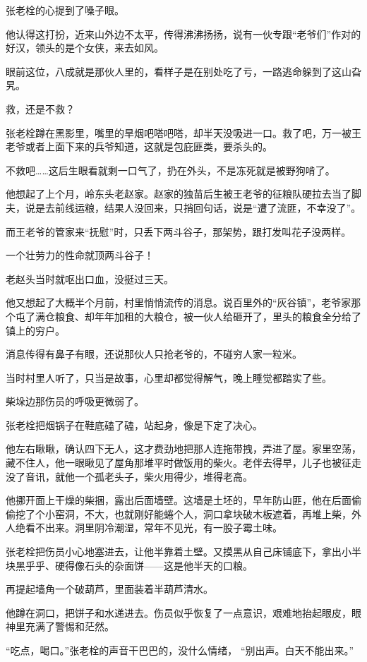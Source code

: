 张老栓的心提到了嗓子眼。

他认得这打扮，近来山外边不太平，传得沸沸扬扬，说有一伙专跟“老爷们”作对的好汉，领头的是个女侠，来去如风。

眼前这位，八成就是那伙人里的，看样子是在别处吃了亏，一路逃命躲到了这山旮旯。

救，还是不救？

张老栓蹲在黑影里，嘴里的旱烟吧嗒吧嗒，却半天没吸进一口。救了吧，万一被王老爷或者上面下来的兵爷知道，这就是包庇匪类，要杀头的。

不救吧……这后生眼看就剩一口气了，扔在外头，不是冻死就是被野狗啃了。

他想起了上个月，岭东头老赵家。赵家的独苗后生被王老爷的征粮队硬拉去当了脚夫，说是去前线运粮，结果人没回来，只捎回句话，说是“遭了流匪，不幸没了”。

而王老爷的管家来“抚慰”时，只丢下两斗谷子，那架势，跟打发叫花子没两样。

一个壮劳力的性命就顶两斗谷子！

老赵头当时就呕出口血，没挺过三天。

他又想起了大概半个月前，村里悄悄流传的消息。说百里外的“灰谷镇”，老爷家那个屯了满仓粮食、却年年加租的大粮仓，被一伙人给砸开了，里头的粮食全分给了镇上的穷户。

消息传得有鼻子有眼，还说那伙人只抢老爷的，不碰穷人家一粒米。

当时村里人听了，只当是故事，心里却都觉得解气，晚上睡觉都踏实了些。

柴垛边那伤员的呼吸更微弱了。

张老栓把烟锅子在鞋底磕了磕，站起身，像是下定了决心。

他左右瞅瞅，确认四下无人，这才费劲地把那人连拖带拽，弄进了屋。家里空荡，藏不住人，他一眼瞅见了屋角那堆平时做饭用的柴火。老伴去得早，儿子也被征走没了音讯，就他一个孤老头子，柴火用得少，堆得老高。

他挪开面上干燥的柴捆，露出后面墙壁。这墙是土坯的，早年防山匪，他在后面偷偷挖了个小窑洞，不大，也就刚好能蜷个人，洞口拿块破木板遮着，再堆上柴，外人绝看不出来。洞里阴冷潮湿，常年不见光，有一股子霉土味。

张老栓把伤员小心地塞进去，让他半靠着土壁。又摸黑从自己床铺底下，拿出小半块黑乎乎、硬得像石头的杂面饼——这是他半天的口粮。

再提起墙角一个破葫芦，里面装着半葫芦清水。

他蹲在洞口，把饼子和水递进去。伤员似乎恢复了一点意识，艰难地抬起眼皮，眼神里充满了警惕和茫然。

“吃点，喝口。”张老栓的声音干巴巴的，没什么情绪， “别出声。白天不能出来。”

